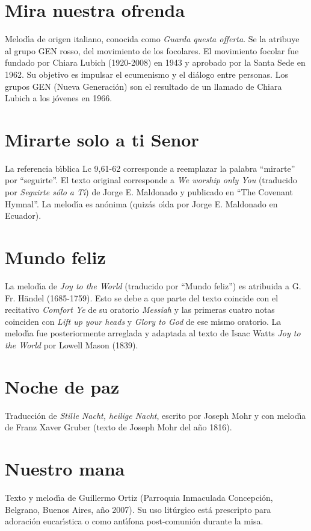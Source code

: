 \documentclass[landscape,12pt]{report}
\begin{document}
\section*{\small Mira nuestra ofrenda} \noindent\footnotesize Melod\'\i a de origen italiano, conocida como \textit{Guarda questa offerta}. Se la atribuye al grupo GEN rosso, del movimiento de los focolares. El movimiento focolar fue fundado por Chiara Lubich (1920-2008) en 1943 y aprobado por la Santa Sede en 1962. Su objetivo es impulsar el ecumenismo y el di\'alogo entre personas. Los grupos GEN (Nueva Generaci\'on) son el resultado de un llamado de Chiara Lubich a los j\'ovenes en 1966.
\section*{\small Mirarte solo a ti Senor} \noindent\footnotesize La referencia b\'\i blica Lc 9,61-62 corresponde a reemplazar la palabra ``mirarte'' por ``seguirte''. El texto original corresponde a \textit{We worship only You} (traducido por \textit{Seguirte s\'olo a T\'\i }) de Jorge E. Maldonado y publicado en ``The Covenant Hymnal''. La melod\'\i a es an\'onima (quiz\'as o\'\i da por Jorge E. Maldonado en Ecuador).  
\section*{\small Mundo feliz} \noindent\footnotesize La melod\'\i a de \textit{Joy to the World} (traducido por ``Mundo feliz'') es atribuida a G. Fr. H\"andel (1685-1759). Esto se debe a que parte del texto coincide con el recitativo \textit{Comfort Ye} de su oratorio \textit{Messiah} y las primeras cuatro notas coinciden con \textit{Lift up your heads} y \textit{Glory to God} de ese mismo oratorio. La melod\'\i a fue posteriormente arreglada  y adaptada al texto de Isaac Watts \textit{Joy to the World} por Lowell Mason (1839).
\section*{\small Noche de paz} \noindent\footnotesize Traducci\'on de \textit{Stille Nacht, heilige Nacht}, escrito por Joseph Mohr y con melod\'\i a de Franz Xaver Gruber (texto de Joseph Mohr del a\~no 1816).
\section*{\small Nuestro mana} \noindent\footnotesize Texto y melod\'\i a de Guillermo Ortiz (Parroquia Inmaculada Concepci\'on, Belgrano, Buenos Aires, a\~no 2007). Su uso lit\'urgico est\'a prescripto para adoraci\'on eucar\'\i stica o como ant\'\i fona post-comuni\'on durante la misa.
\end{document}
